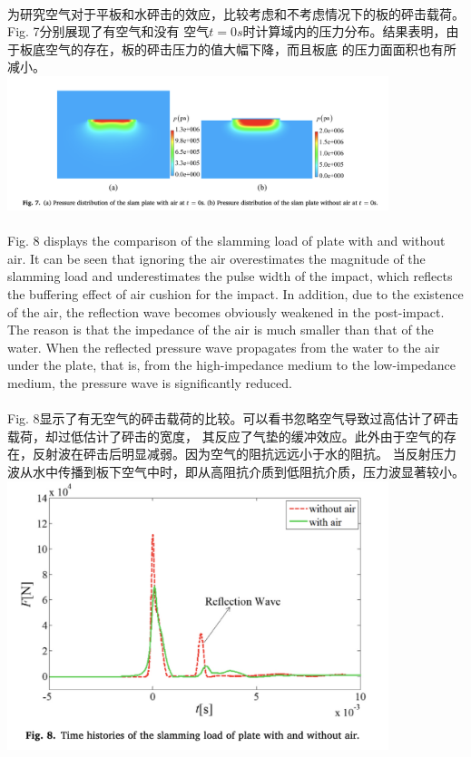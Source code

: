 \documentclass[UTF8]{ctexart}
\begin{document}
\paragraph{\quad}为研究空气对于平板和水砰击的效应，比较考虑和不考虑情况下的板的砰击载荷。Fig. 7分别展现了有空气和没有
                空气$t=0s$时计算域内的压力分布。结果表明，由于板底空气的存在，板的砰击压力的值大幅下降，而且板底
                的压力面面积也有所减小。\\
{
    \centering
    \includegraphics[width=30em]{./source/Fig7.png}
}

\paragraph{\quad}Fig. 8 displays the comparison of the slamming load of plate with and without air. 
                It can be seen that ignoring the air overestimates the magnitude of the slamming 
                load and underestimates the pulse width of the impact, which reflects the buffering 
                effect of air cushion for the impact. In addition, due to the existence of the air, 
                the reflection wave becomes obviously weakened in the post-impact. The reason is 
                that the impedance of the air is much smaller than that of the water. When the 
                reflected pressure wave propagates from the water to the air under the plate, 
                that is, from the high-impedance medium to the low-impedance medium, 
                the pressure wave is significantly reduced.
\paragraph{\quad}Fig. 8显示了有无空气的砰击载荷的比较。可以看书忽略空气导致过高估计了砰击载荷，却过低估计了砰击的宽度，
                其反应了气垫的缓冲效应。此外由于空气的存在，反射波在砰击后明显减弱。因为空气的阻抗远远小于水的阻抗。
                当反射压力波从水中传播到板下空气中时，即从高阻抗介质到低阻抗介质，压力波显著较小。\\
{
    \centering
    \includegraphics[width=30em]{./source/Fig8.png}
}
\end{document}
